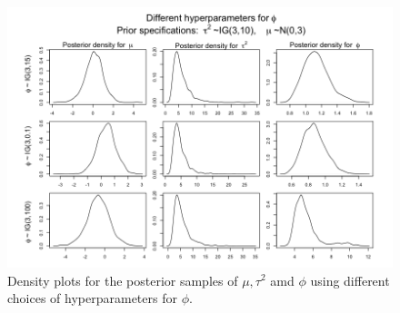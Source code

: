 \documentclass[a4paper, 10pt]{article}
\newcommand{\tausq}{\tau^2}
\begin{document}
\begin{enumerate}
\begin{enumerate}
        \begin{figure}[h!]
            \centering
            \includegraphics[scale =0.45]{Change_phis.png}
            \caption{Density plots for the posterior samples of $\mu, \tausq$ amd $\phi$ using different choices of hyperparameters for $\phi$.}
            \label{change_phis}
        \end{figure}
    

\end{enumerate}
\end{enumerate}
\end{document}
